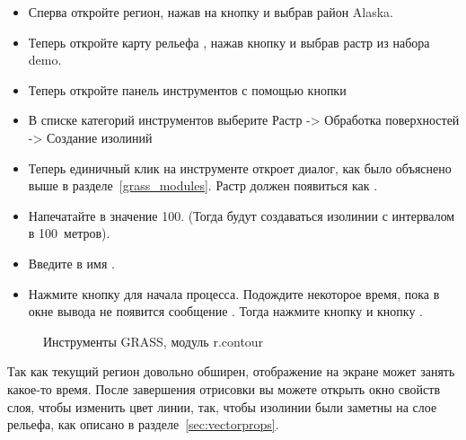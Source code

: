 \begin{itemize}[label=--]
\item Сперва откройте регион, нажав на кнопку
 и выбрав район Alaska.
\item Теперь откройте карту рельефа , нажав кнопку
 и
выбрав растр  из набора demo.
\item Теперь откройте панель инструментов с помощью кнопки
\item В списке категорий инструментов выберите Растр -> Обработка
поверхностей -> Создание изолиний
\item Теперь единичный клик на инструменте 
откроет диалог, как было объяснено выше в разделе~\ref{grass_modules}.
Растр  должен появиться как
.
\item Напечатайте в 
значение 100. (Тогда будут создаваться изолинии с интервалом в
100~метров).
\item Введите в 
имя .
\item Нажмите кнопку  для начала процесса. Подождите
некоторое время, пока в окне вывода не появится сообщение
. Тогда нажмите кнопку
 и кнопку .
\end{itemize}

\begin{figure}[ht]
\centering
    \hspace{0.5cm}
   \caption{\grass Инструменты GRASS, модуль r.contour \nixcaption}\label{fig:grass_toolbox_rcontour}
\end{figure}


Так как текущий регион довольно обширен, отображение на экране может
занять какое-то время. После завершения отрисовки вы можете открыть окно
свойств слоя, чтобы изменить цвет линии, так, чтобы изолинии были заметны
на слое рельефа, как описано в разделе~\ref{sec:vectorprops}.

